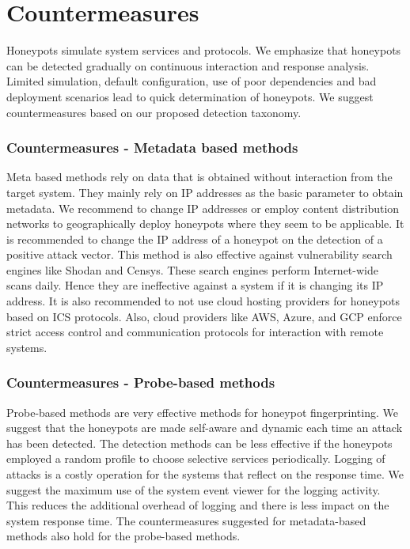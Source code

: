 \section{Countermeasures}
\label{sec:counter}

Honeypots simulate system services and protocols. We emphasize that honeypots can be detected gradually on continuous interaction and response analysis. Limited simulation, default configuration, use of poor dependencies and bad deployment scenarios lead to quick determination of honeypots. We suggest countermeasures based on our proposed detection taxonomy. 

\subsubsection{Countermeasures - Metadata based methods}
Meta based methods rely on data that is obtained without interaction from the target system. They mainly rely on IP addresses as the basic parameter to obtain metadata. We recommend to change IP addresses or employ content distribution networks to geographically deploy honeypots where they seem to be applicable.  It is recommended to change the IP address of a honeypot on the detection of a positive attack vector. This method is also effective against vulnerability search engines like Shodan and Censys. These search engines perform Internet-wide scans daily. Hence they are ineffective against a system if it is changing its IP address. It is also recommended to not use cloud hosting providers for honeypots based on ICS protocols. Also, cloud providers like AWS, Azure, and GCP enforce strict access control and communication protocols for interaction with remote systems. 


\subsubsection{Countermeasures - Probe-based methods}
Probe-based methods are very effective methods for honeypot fingerprinting. We suggest that the honeypots are made self-aware and dynamic each time an attack has been detected. The detection methods can be less effective if the honeypots employed a random profile to choose selective services periodically.  Logging of attacks is a costly operation for the systems that reflect on the response time. We suggest the maximum use of the system event viewer for the logging activity. This reduces the additional overhead of logging and there is less impact on the system response time. The countermeasures suggested for metadata-based methods also hold for the probe-based methods. 

